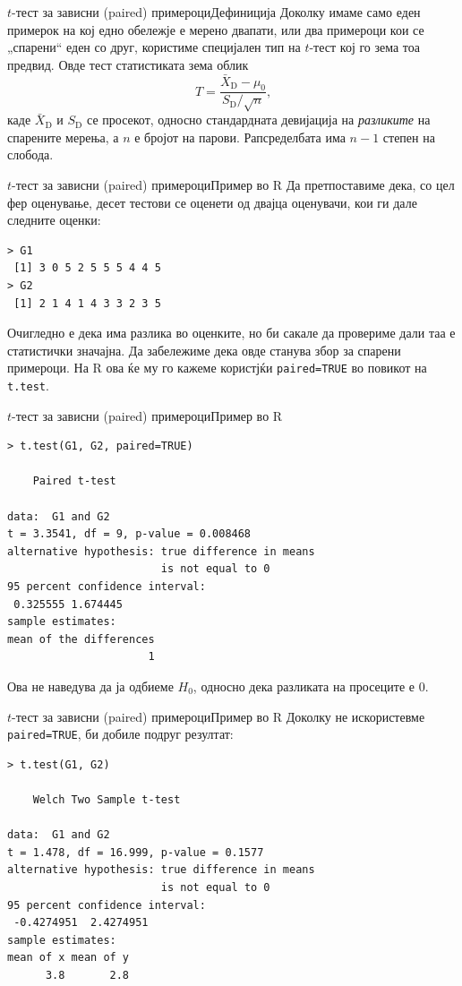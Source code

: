 \documentclass[hyperref={unicode}, xcolor={svgnames, table},
usepdftitle=false]{beamer}
\theoremstyle{remark}
\begin{document}
\begin{frame}{\(t\)-тест за зависни (paired) примероци}{Дефиниција}
  Доколку имаме само еден примерок на кој едно обележје е мерено двапати, или
  два примероци кои се „спарени“ еден со друг, користиме специјален тип на
  \(t\)-тест кој го зема тоа предвид.  Овде тест статистиката зема облик
  \[
    T = \frac{\bar{X}_{\mathrm{D}} - \mu_0}{S_{\mathrm{D}} / {\sqrt{n}}}\text{,}
  \]
  каде \(\bar{X}_{\mathrm{D}}\) и \(S_{\mathrm{D}}\) се просекот, односно
  стандардната девијација на \emph{разликите} на спарените мерења, а \(n\) е
  бројот на парови.  Рапсределбата има \(n - 1\) степен на слобода.
\end{frame}

\begin{frame}[fragile]{\(t\)-тест за зависни (paired) примероци}{Пример во R}
  Да претпоставиме дека, со цел фер оценување, десет тестови се оценети од
  двајца оценувачи, кои ги дале следните оценки:
\begin{verbatim}
> G1
 [1] 3 0 5 2 5 5 5 4 4 5
> G2
 [1] 2 1 4 1 4 3 3 2 3 5
\end{verbatim}
  Очигледно е дека има разлика во оценките, но би сакале да провериме дали таа е
  статистички значајна.  Да забележиме дека овде станува збор за спарени
  примероци.  На R ова ќе му го кажеме користјќи \texttt{paired=TRUE} во
  повикот на \texttt{t.test}.
\end{frame}

\begin{frame}[fragile]{\(t\)-тест за зависни (paired) примероци}{Пример во R}
\begin{verbatim}
> t.test(G1, G2, paired=TRUE)

	Paired t-test

data:  G1 and G2
t = 3.3541, df = 9, p-value = 0.008468
alternative hypothesis: true difference in means
                        is not equal to 0
95 percent confidence interval:
 0.325555 1.674445
sample estimates:
mean of the differences
                      1
\end{verbatim}
  Ова не наведува да ја одбиеме \(H_0\), односно дека разликата на просеците е
  \(0\).
\end{frame}

\begin{frame}[fragile]{\(t\)-тест за зависни (paired) примероци}{Пример во R}
  Доколку не искористевме \texttt{paired=TRUE}, би добиле подруг
  резултат:
\begin{verbatim}
> t.test(G1, G2)

	Welch Two Sample t-test

data:  G1 and G2
t = 1.478, df = 16.999, p-value = 0.1577
alternative hypothesis: true difference in means
                        is not equal to 0
95 percent confidence interval:
 -0.4274951  2.4274951
sample estimates:
mean of x mean of y
      3.8       2.8
\end{verbatim}
\end{frame}
\end{document}
